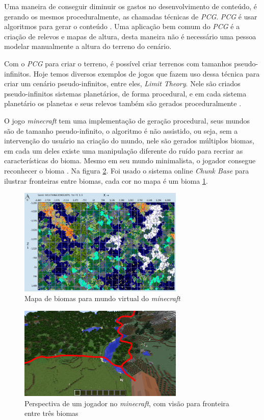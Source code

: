 Uma maneira de conseguir diminuir os gastos no desenvolvimento de conteúdo, é 
gerando os mesmos proceduralmente, as chamadas técnicas de \textit{PCG}. 
\textit{PCG} é usar algoritmos para gerar o conteúdo \cite{shaker2016procedural}.
Uma aplicação bem comum do \textit{PCG} é a criação de relevos e mapas de altura,
desta maneira não é necessário uma pessoa modelar manualmente a altura do
terreno do cenário.

Com o \textit{PCG} para criar o terreno, é possível criar terrenos com tamanhos
pseudo-infinitos. Hoje temos diversos exemplos de jogos que fazem uso dessa técnica
para criar um cenário pseudo-infinitos, entre eles, \textit{Limit Theory}. Nele
são criados pseudo-infinitos sistemas planetários, de forma procedural, e em cada
sistema planetário os planetas e seus relevos também são gerados proceduralmente
\cite{abreu1990toward}.

O jogo \textit{minecraft} tem uma implementação de geração procedural,
seus mundos são de tamanho pseudo-infinito, 
o algoritmo é não assistido, ou seja, sem a intervenção
do usuário na criação do mundo, nele
são gerados múltiplos biomas, em cada um deles existe uma manipulação diferente
do ruído para recriar as características do bioma. Mesmo em seu mundo
minimalista, o jogador consegue reconhecer o bioma \cite{short2012teaching}.
Na figura \ref{fig:biomesminecraftgameplay}.
Foi usado o sistema online \textit{Chunk Base} para 
ilustrar fronteiras entre biomas, cada cor no mapa é um bioma \ref{fig:chunkbasebiomes}.


\begin{figure}[H]
    \centering
    \includegraphics[width=0.7\textwidth]{figuras/chunkbasebiomes.png}
    \caption{Mapa de biomas para mundo virtual do \textit{minecraft}}
    \label{fig:chunkbasebiomes}
\end{figure}

\begin{figure}[H]
    \centering
    \includegraphics[width=0.7\textwidth]{figuras/biomesminecraftgameplay.png}
    \caption{Perspectiva de um jogador no \textit{minecraft}, com visão para fronteira entre três biomas}
    \label{fig:biomesminecraftgameplay}
\end{figure}
